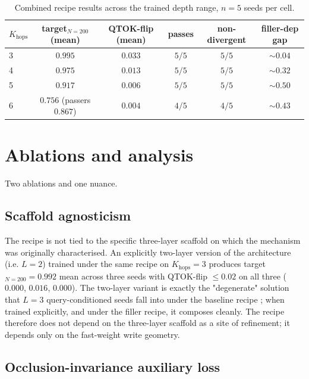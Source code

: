 \documentclass[11pt]{article}
\begin{document}
\begin{table}[h]
\centering
\small
\caption{Combined recipe results across the trained depth range,
$n = 5$ seeds per cell.}
\label{tab:main}
\begin{tabular}{lccccc}
\toprule
$K_{\mathrm{hops}}$ & target$_{N=200}$ (mean) & QTOK-flip (mean) & passes & non-divergent & filler-dep gap \\
\midrule
3 & $0.995$ & $0.033$ & $5/5$ & $5/5$ & $\sim 0.04$ \\
4 & $0.975$ & $0.013$ & $5/5$ & $5/5$ & $\sim 0.32$ \\
5 & $0.917$ & $0.006$ & $5/5$ & $5/5$ & $\sim 0.50$ \\
6 & $0.756$ (passers $0.867$) & $0.004$ & $4/5$ & $4/5$ & $\sim 0.43$ \\
\bottomrule
\end{tabular}
\end{table}

\section{Ablations and analysis}
\label{sec:ablations}

Two ablations and one nuance.

\subsection{Scaffold agnosticism}

The recipe is not tied to the specific three-layer scaffold on
which the mechanism was originally characterised. An explicitly
two-layer version of the architecture (i.e. $L = 2$) trained under
the same recipe on $K_{\mathrm{hops}} = 3$ produces
target$_{N=200} = 0.992$ mean across three seeds with
QTOK-flip $\le 0.02$ on all three ($0.000$, $0.016$, $0.000$). The two-layer variant is exactly
the "degenerate" solution that $L = 3$ query-conditioned seeds fall
into under the baseline recipe \citep{fenrir2026}; when trained
explicitly, and under the filler recipe, it composes cleanly. The
recipe therefore does not depend on the three-layer scaffold as a
site of refinement; it depends only on the fast-weight write
geometry.

\subsection{Occlusion-invariance auxiliary loss}
\end{document}
